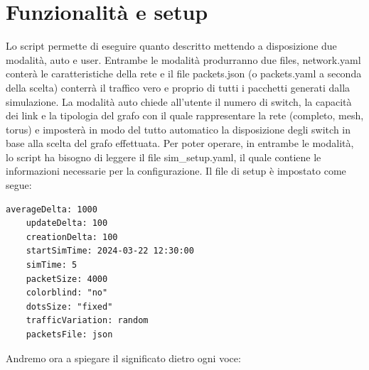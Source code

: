 \documentclass[binding=0.6cm]{sapthesis}
\begin{document}
\section{Funzionalità e setup} 
Lo script permette di eseguire quanto descritto mettendo a
 disposizione due modalità, auto e user. Entrambe le modalità produrranno due files, 
 network.yaml conterà le caratteristiche della rete e il file packets.json (o packets.yaml
 a seconda della scelta) conterrà il traffico vero e proprio di tutti i pacchetti generati 
 dalla simulazione. La modalità auto chiede all'utente il numero di switch, la capacità dei
  link e la tipologia del grafo con il quale rappresentare la rete (completo, mesh, torus) e
   imposterà in modo del tutto automatico
   la disposizione degli switch in base alla scelta del grafo effettuata. Per poter operare,
    in entrambe le modalità, lo script ha bisogno di leggere il file sim\_setup.yaml, il quale contiene le informazioni necessarie per la configurazione. 
    Il file di setup è impostato come segue:
{\scriptsize %
\begin{lstlisting}[caption={esempio di setup file}, label={codice:sim_setup_example}]
    averageDelta: 1000
    updateDelta: 100
    creationDelta: 100
    startSimTime: 2024-03-22 12:30:00
    simTime: 5
    packetSize: 4000
    colorblind: "no"
    dotsSize: "fixed"
    trafficVariation: random
    packetsFile: json
\end{lstlisting}
}
Andremo ora a spiegare il significato dietro ogni voce:
\end{document}
